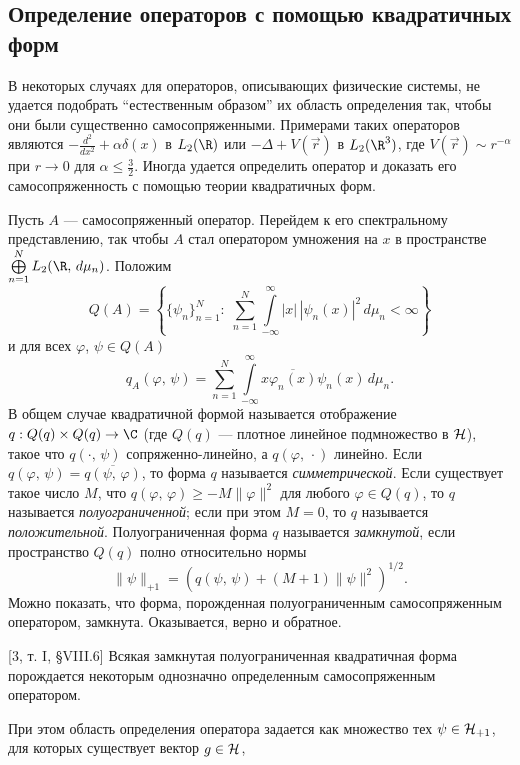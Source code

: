 \documentclass[a4paper
]{article}
\begin{document}
\subsection{Определение операторов с помощью квадратичных \\ форм}
В некоторых случаях для операторов, описывающих физические
системы, не удается подобрать ``естественным образом'' их область
определения так, чтобы они были существенно самосопряженными.
Примерами таких операторов являются $-\frac{d^2}{dx^2}+\alpha
\delta(x)$ в $L_2(\R)$ или $-\Delta+V(\vec r)$ в $L_2(\R^3)$, где
$V(\vec r)\sim r^{-\alpha}$ при $r\rightarrow 0$ для $\alpha\le
\frac 32$. Иногда удается определить оператор и доказать его
самосопряженность с помощью теории квадратичных форм. \par Пусть
$A$ --- самосопряженный оператор. Перейдем к его спектральному
представлению, так чтобы $A$ стал оператором умножения на $x$ в
пространстве\\ $\bigoplus \limits_{n=1}^N L_2(\R, \, d\mu_n)$.
Положим
$$Q(A)=\left\{\{\psi_n\}_{n=1}^N: \; \sum \limits_{n=1}^N
\int \limits_{-\infty}^\infty|x|\, |\psi_n(x)|^2\, d\mu_n<\infty\right\}$$
и для всех $\varphi$, $\psi\in Q(A)$
$$q_A(\varphi, \, \psi)=\sum \limits _{n=1}^N\int \limits_{-\infty}
^\infty x\overline{\varphi_n(x)}\psi_n(x)\, d\mu_n.$$
В общем случае квадратичной формой называется отображение $q:Q(q)\times
Q(q)\rightarrow \C$ (где $Q(q)$ --- плотное линейное подмножество в
${\cal H}$), такое что $q(\cdot, \, \psi)$ сопряженно-линейно, а
$q(\varphi, \, \cdot)$ линейно. Если $q(\varphi, \, \psi)=\overline
{q(\psi, \, \varphi)}$, то форма $q$ называется {\it симметрической}.
Если существует такое число $M$, что $q(\varphi, \, \varphi)\ge
-M\|\varphi\|^2$ для любого $\varphi\in Q(q)$, то $q$ называется
{\it полуограниченной}; если при этом $M=0$, то $q$ называется
{\it положительной}. Полуограниченная форма $q$ называется {\it замкнутой},
если пространство $Q(q)$ полно относительно нормы $$\|\psi\|_{+1}=\left(q(\psi, \, \psi)+
(M+1)\|\psi\|^2\right)^{1/2}.$$ Можно показать, что
форма, порожденная полуограниченным самосопряженным оператором, замкнута.
Оказывается, верно и обратное.
\begin{Trm}
\label{oper_form}
{\rm [3, т. I, \S VIII.6]} Всякая замкнутая полуограниченная
квадратичная форма порождается некоторым однозначно определенным
самосопряженным оператором.
\end{Trm}
При этом область определения оператора задается как множество тех $\psi
\in {\cal H}_{+1}$, для которых существует вектор $g\in {\cal H}$,
\end{document}
